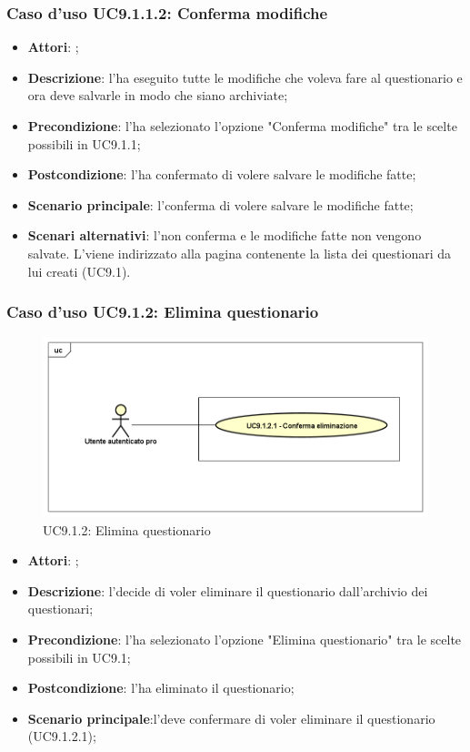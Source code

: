 					\subsubsection{Caso d'uso UC9.1.1.2: Conferma modifiche}
					\label{UC9.1.1.2}
					\begin{itemize}
						\item \textbf{Attori}: \uaupro;
						\item \textbf{Descrizione}: l'\uaupro ha eseguito tutte le modifiche che voleva fare al questionario e ora deve salvarle in modo che siano archiviate;
						\item \textbf{Precondizione}: l'\uaupro ha selezionato l'opzione "Conferma modifiche" tra le scelte possibili in UC9.1.1;
						\item \textbf{Postcondizione}: l'\uaupro ha confermato di volere salvare le modifiche fatte;
						\item \textbf{Scenario principale}: l'\uaupro conferma di volere salvare le modifiche fatte;
						\item \textbf{Scenari alternativi}: l'\uaupro non conferma e le modifiche fatte non vengono salvate. L'\uaupro viene indirizzato alla pagina contenente la lista dei questionari da lui creati (UC9.1).
					\end{itemize}
										
			\subsubsection{Caso d'uso UC9.1.2: Elimina questionario}
			\label{UC9.1.2}
			\begin{figure}[h]
				\centering
			\includegraphics[scale=0.5,keepaspectratio]{UML/UC9_1_2.png}
				\caption{UC9.1.2: Elimina questionario}
			\end{figure}
			\FloatBarrier
			\begin{itemize}
				\item \textbf{Attori}: \uaupro;
				\item \textbf{Descrizione}: l'\uaupro decide di voler eliminare il questionario dall'archivio dei questionari;
				\item \textbf{Precondizione}: l'\uaupro ha selezionato l'opzione "Elimina questionario" tra le scelte possibili in UC9.1;
				\item \textbf{Postcondizione}: l'\uaupro ha eliminato il questionario;
				\item \textbf{Scenario principale}:l'\uaupro deve confermare di voler eliminare il questionario (UC9.1.2.1);
			\end{itemize}
			
